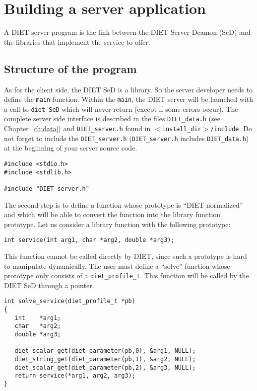 \chapter{Building a server application}
\label{ch:server}

A DIET server program is the link between the DIET Server Deamon
(SeD) and the libraries that implement the service to offer.

\section{Structure of the program}
\label{sec:sv_struct}

As for the client side, the DIET SeD is a library. So the server
developer needs to define the \texttt{main} function. Within the
\texttt{main}, the DIET server will be launched with a call to
\texttt{diet\_SeD} which will never return (except if some errors
occur). The complete server side interface is described in the files
\texttt{DIET\_data.h} (see Chapter~\ref{ch:data}) and \texttt{DIET\_server.h}
found in \texttt{$<$install\_dir$>$/include}. Do not forget to
include the \texttt{DIET\_server.h} (\texttt{DIET\_server.h}
includes \texttt{DIET\_data.h}) at the beginning of your server
source code.

{\footnotesize
\begin{verbatim}
#include <stdio.h>
#include <stdlib.h>

#include "DIET_server.h"
\end{verbatim}
}

The second step is to define a function whose prototype is ``DIET-normalized''
and which will be able to convert the function into the library function prototype.
Let us consider a library function with the following prototype:
{\footnotesize
\begin{verbatim}
int service(int arg1, char *arg2, double *arg3);
\end{verbatim}
}

This function cannot be called directly by DIET, since such a prototype is hard
to manipulate dynamically. The user must define a ``solve'' function whose
prototype only consists of a \texttt{diet\_profile\_t}.
This function will be called by the DIET SeD through a pointer.
{\footnotesize
\begin{verbatim}
int solve_service(diet_profile_t *pb)
{
   int    *arg1;
   char   *arg2;
   double *arg3;

   diet_scalar_get(diet_parameter(pb,0), &arg1, NULL);
   diet_string_get(diet_parameter(pb,1), &arg2, NULL);
   diet_scalar_get(diet_parameter(pb,2), &arg3, NULL);
   return service(*arg1, arg2, arg3);
}
\end{verbatim}
}

